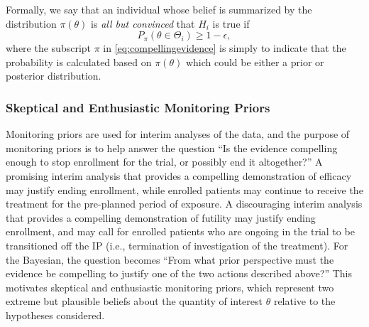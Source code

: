 \documentclass[useAMS,usenatbib,referee]{biom}
\begin{document}
Formally, we say that an individual whose belief is summarized by the distribution $\pi\left(\theta\right)$ is \textit{all but convinced} that $H_i$ is true if 
\begin{equation}\label{eq:compellingevidence}
		P_\pi(\theta\in\Theta_i)\geq 1-\epsilon,
\end{equation} 
where the subscript $\pi$ in \eqref{eq:compellingevidence} is simply to indicate that the probability is calculated based on $\pi\left(\theta\right)$ which could be either a prior
or posterior distribution.

\subsubsection{Skeptical and Enthusiastic Monitoring Priors}\label{sec:MP}
Monitoring priors are used for interim analyses of the data, and the purpose of monitoring priors is to help answer the question ``Is the evidence compelling enough to stop enrollment for the trial, or possibly end it altogether?''
%
A promising interim analysis that provides a compelling demonstration of efficacy may justify ending enrollment, while enrolled patients may continue to receive the treatment for the pre-planned period of exposure. 
%
A discouraging interim analysis that provides a compelling demonstration of futility may justify ending enrollment, and may call for enrolled patients who are ongoing in the trial to be transitioned off the IP (i.e., termination of investigation of the treatment). 
%
For the Bayesian, the question becomes ``From what prior perspective must the evidence be compelling to justify one of the two actions described above?'' 
%
This motivates skeptical and enthusiastic monitoring priors, which represent two extreme but plausible beliefs about the quantity of interest $\theta$ relative to the hypotheses considered.
%
\end{document}
